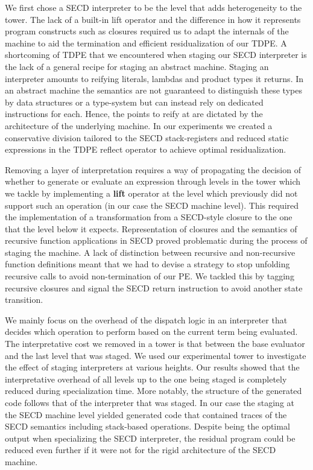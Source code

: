 \documentclass[a4paper,12pt,twoside,openright]{report}
\theoremstyle{definition}
\begin{document}
We first chose a SECD interpreter to be the level that adds heterogeneity to the tower. The lack of a built-in lift operator and the difference in how it represents program constructs such as closures required us to adapt the internals of the machine to aid the termination and efficient residualization of our TDPE. A shortcoming of TDPE that we encountered when staging our SECD interpreter is the lack of a general recipe for staging an abstract machine. Staging an interpreter amounts to reifying literals, lambdas and product types it returns. In an abstract machine the semantics are not guaranteed to distinguish these types by data structures or a type-system but can instead rely on dedicated instructions for each. Hence, the points to reify at are dictated by the architecture of the underlying machine. In our experiments we created a conservative division tailored to the SECD stack-registers and reduced static expressions in the TDPE reflect operator to achieve optimal residualization.

Removing a layer of interpretation requires a way of propagating the decision of whether to generate or evaluate an expression through levels in the tower which we tackle by implementing a \textbf{lift} operator at the level which previously did not support such an operation (in our case the SECD machine level). This required the implementation of a transformation from a SECD-style closure to the one that the level below it expects.
Representation of closures and the semantics of recursive function applications in SECD proved problematic during the process of staging the machine. A lack of distinction between recursive and non-recursive function definitions meant that we had to devise a strategy to stop unfolding recursive calls to avoid non-termination of our PE. We tackled this by tagging recursive closures and signal the SECD return instruction to avoid another state transition.

We mainly focus on the overhead of the dispatch logic in an interpreter that decides which operation to perform based on the current term being evaluated. The interpretative cost we removed in a tower is that between the base evaluator and the last level that was staged. We used our experimental tower to investigate the effect of staging interpreters at various heights. Our results showed that the interpretative overhead of all levels up to the one being staged is completely reduced during specialization time. More notably, the structure of the generated code follows that of the interpreter that was staged. In our case the staging at the SECD machine level yielded generated code that contained traces of the SECD semantics including stack-based operations. Despite being the optimal output when specializing the SECD interpreter, the residual program could be reduced even further if it were not for the rigid architecture of the SECD machine.
\end{document}
